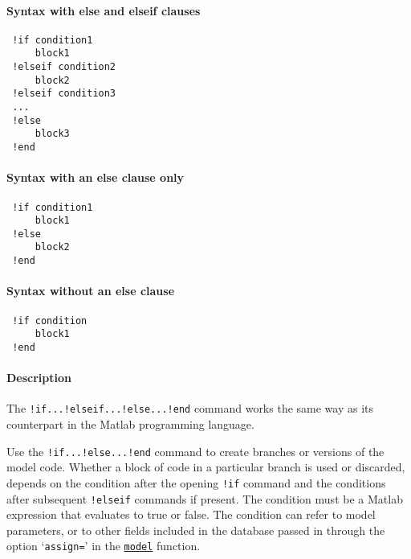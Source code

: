 


	\paragraph{Syntax with else and elseif clauses}
 
 \begin{verbatim}
 !if condition1
     block1
 !elseif condition2
     block2
 !elseif condition3
 ...
 !else
     block3
 !end
 \end{verbatim}
 
 \paragraph{Syntax with an else clause only}
 
 \begin{verbatim}
 !if condition1
     block1
 !else
     block2
 !end
 \end{verbatim}
 
 \paragraph{Syntax without an else clause}
 
 \begin{verbatim}
 !if condition
     block1
 !end
 \end{verbatim}
 
 \paragraph{Description}
 
 The \texttt{!if...!elseif...!else...!end} command works the same way as
 its counterpart in the Matlab programming language.
 
 Use the \texttt{!if...!else...!end} command to create branches or
 versions of the model code. Whether a block of code in a particular
 branch is used or discarded, depends on the condition after the opening
 \texttt{!if} command and the conditions after subsequent
 \texttt{!elseif} commands if present. The condition must be a Matlab
 expression that evaluates to true or false. The condition can refer to
 model parameters, or to other fields included in the database passed in
 through the option `\texttt{assign=}' in the
 \href{model/model}{\texttt{model}} function.
 
